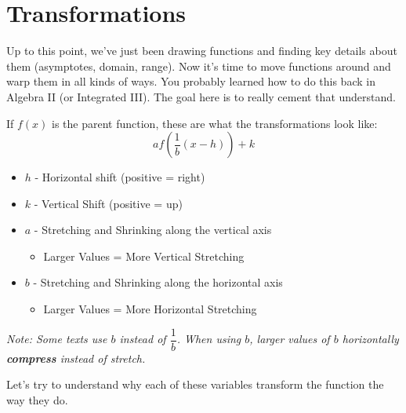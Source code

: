 \chapter{Transformations}
\vspace{-1cm}
Up to this point, we've just been drawing functions and finding key details about them (asymptotes, domain, range). Now it's time to move functions around and warp them in all kinds of ways. You probably learned how to do this back in Algebra II (or Integrated III). The goal here is to really cement that understand.

\noindent If $f(x)$ is the parent function, these are what the transformations look like:
\[
    af\left(\frac{1}{b}(x - h)\right) + k
\]
\begin{itemize}
    \item $h$ - Horizontal shift (positive = right)
    \item $k$ - Vertical Shift (positive = up)
    \item $a$ - Stretching and Shrinking along the vertical axis
    \begin{itemize}
        \item Larger Values = More Vertical Stretching
    \end{itemize}  
    \item $b$ - Stretching and Shrinking along the horizontal axis
    \begin{itemize}
        \item Larger Values = More Horizontal Stretching
    \end{itemize}
\end{itemize}
\textit{Note: Some texts use $b$ instead of $\dfrac{1}{b}$. When using $b$, larger values of $b$ horizontally \textbf{compress} instead of stretch.}

Let's try to understand why each of these variables transform the function the way they do.
